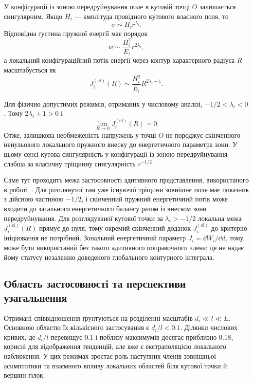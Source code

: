 У конфігурації із зоною передруйнування поле в кутовій точці $O$
залишається сингулярним. Якщо $H_i$ --- амплітуда провідного кутового
власного поля, то
\begin{equation*}
  \sigma\sim H_i r^{\lambda_i}.
\end{equation*}
Відповідна густина пружної енергії має порядок
\begin{equation*}
  w\sim\frac{H_i^2}{E_i}r^{2\lambda_i},
\end{equation*}
а локальний конфігураційний потік енергії через контур характерного
радіуса $R$ масштабується як
\begin{equation}
\label{eq:local-elastic-flux-scaling}
  J_i^{(\mathrm{el})}(R)
  \sim\frac{H_i^2}{E_i}R^{2\lambda_i+1}.
\end{equation}

Для фізично допустимих режимів, отриманих у числовому аналізі,
$-1/2<\lambda_i<0$. Тому $2\lambda_i+1>0$ і
\begin{equation*}
  \lim_{R\to0}J_i^{(\mathrm{el})}(R)=0.
\end{equation*}
Отже, залишкова необмеженість напружень у точці $O$ не породжує
скінченного ненульового локального пружного внеску до енергетичного
параметра зони. У цьому сенсі кутова сингулярність у конфігурації із
зоною передруйнування слабша за класичну тріщинну сингулярність
$r^{-1/2}$.

Саме тут проходить межа застосовності адитивного представлення,
використаного в роботі~\cite{KaminskyDudyk2026Criteria}. Для
розглянутої там уже існуючої тріщини зовнішнє поле має показник з дійсною частиною $-1/2$, і
скінченний пружний енергетичний потік може входити до загального
енергетичного балансу разом із внеском зони передруйнування. Для
розглядуваної кутової точки за $\lambda_i>-1/2$ локальна межа
$J_i^{(\mathrm{el})}(R)$ прямує до нуля, тому окремий скінченний
доданок $J_i^{(\mathrm{el})}$ до критерію ініціювання не потрібний.
Зональний енергетичний параметр $J_i=\dd W_i/\dd d_i$ тому може бути
використаний без такого адитивного поправочного члена; це не надає йому
статусу незалежно доведеного глобального контурного інтеграла.

\subsection{Область застосовності та перспективи узагальнення}
\label{subsec:discussion-scope}

Отримані співвідношення ґрунтуються на розділенні масштабів
$d_i\ll l\ll L$. Основною областю їх кількісного застосування є
$d_i/l<0.1$. Ділянки числових кривих, де $d_i/l$ перевищує $0.1$ і
поблизу максимумів досягає приблизно $0.18$, корисні для відображення
тенденцій, але вже є екстраполяцією локального наближення. У цих режимах
зростає роль наступних членів зовнішньої асимптотики та взаємного впливу
локальних областей біля кутової точки й вершин гілок.

